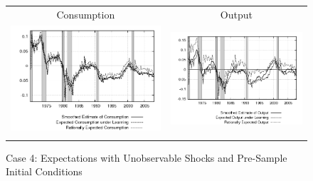 \begin{figure}\label{fg:exp_wlsinit}\caption{Case 4: Expectations with Unobservable Shocks and Pre-Sample Initial Conditions}\vspace*{1pc}
\hspace*{-0.7in}\begin{tabular}{cc}
Consumption & Output \\
\includegraphics[scale=0.52]{results_wlsinit/consumption_exp.png} & 
\includegraphics[scale=0.52]{results_wlsinit/output_exp.png} \\ \\ 
 

\end{tabular}
\end{figure}
